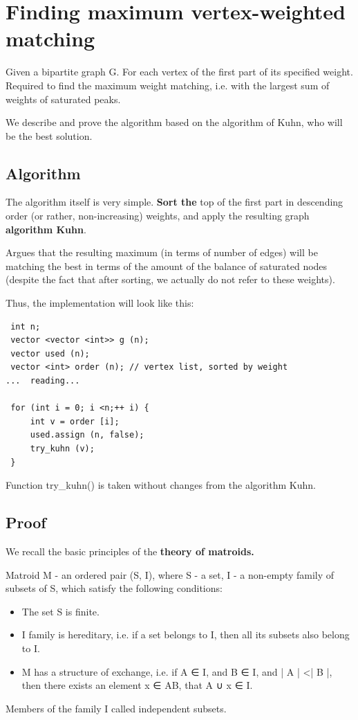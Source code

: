 \section{ Finding maximum vertex-weighted matching }
Given a bipartite graph G. For each vertex of the first part of its specified weight. Required to find the maximum weight matching, i.e. with the largest sum of weights of saturated peaks.

We describe and prove the algorithm based on the algorithm of Kuhn, who will be the best solution.

\subsection{ Algorithm }
The algorithm itself is very simple. \textbf{Sort the} top of the first part in descending order (or rather, non-increasing) weights, and apply the resulting graph \textbf{algorithm Kuhn}.

Argues that the resulting maximum (in terms of number of edges) will be matching the best in terms of the amount of the balance of saturated nodes (despite the fact that after sorting, we actually do not refer to these weights).

Thus, the implementation will look like this:

\begin{verbatim}
 int n;
 vector <vector <int>> g (n);
 vector used (n);
 vector <int> order (n); // vertex list, sorted by weight
...  reading...

 for (int i = 0; i <n;++ i) {
     int v = order [i];
     used.assign (n, false);
     try_kuhn (v);
 } 
\end{verbatim}
Function try\_kuhn() is taken without changes from the algorithm Kuhn.

\subsection{ Proof }
We recall the basic principles of the \textbf{theory of matroids.}

Matroid M - an ordered pair (S, I), where S - a set, I - a non-empty family of subsets of S, which satisfy the following conditions:

\begin{itemize}
\item The set S is finite. 
\item I family is hereditary, i.e. if a set belongs to I, then all its subsets also belong to I. 
\item M has a structure of exchange, i.e. if A ∈ I, and B ∈ I, and | A | <| B |, then there exists an element x ∈ AB, that A ∪ x ∈ I.
\end{itemize}
Members of the family I called independent subsets.

